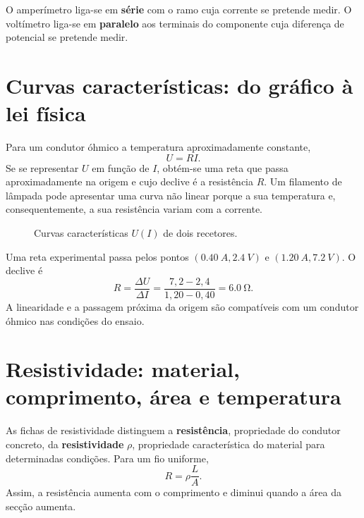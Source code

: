 \documentclass[11pt,a4paper,oneside]{book}
\begin{document}
\begin{nota}
O amperímetro liga-se em \textbf{série} com o ramo cuja corrente se pretende medir. O voltímetro liga-se em \textbf{paralelo} aos terminais do componente cuja diferença de potencial se pretende medir.
\end{nota}

\section{Curvas características: do gráfico à lei física}
Para um condutor óhmico a temperatura aproximadamente constante,
\[
U=RI.
\]
Se se representar $U$ em função de $I$, obtém-se uma reta que passa aproximadamente na origem e cujo declive é a resistência $R$. Um filamento de lâmpada pode apresentar uma curva não linear porque a sua temperatura e, consequentemente, a sua resistência variam com a corrente.

\begin{figure}[H]
\centering
{}
\caption{Curvas características $U(I)$ de dois recetores.}
\end{figure}

\begin{exemplo}[title=Exemplo resolvido -- resistência a partir de uma curva $U(I)$]
Uma reta experimental passa pelos pontos $(\SI{0.40}{A},\SI{2.4}{V})$ e $(\SI{1.20}{A},\SI{7.2}{V})$. O declive é
\[
R=\frac{\Delta U}{\Delta I}=\frac{7{,}2-2{,}4}{1{,}20-0{,}40}=\SI{6.0}{\ohm}.
\]
A linearidade e a passagem próxima da origem são compatíveis com um condutor óhmico nas condições do ensaio.
\end{exemplo}

\section{Resistividade: material, comprimento, área e temperatura}
As fichas de resistividade distinguem a \textbf{resistência}, propriedade do condutor concreto, da \textbf{resistividade} $\rho$, propriedade característica do material para determinadas condições. Para um fio uniforme,
\[
R=\rho\frac{L}{A}.
\]
Assim, a resistência aumenta com o comprimento e diminui quando a área da secção aumenta.
\end{document}
